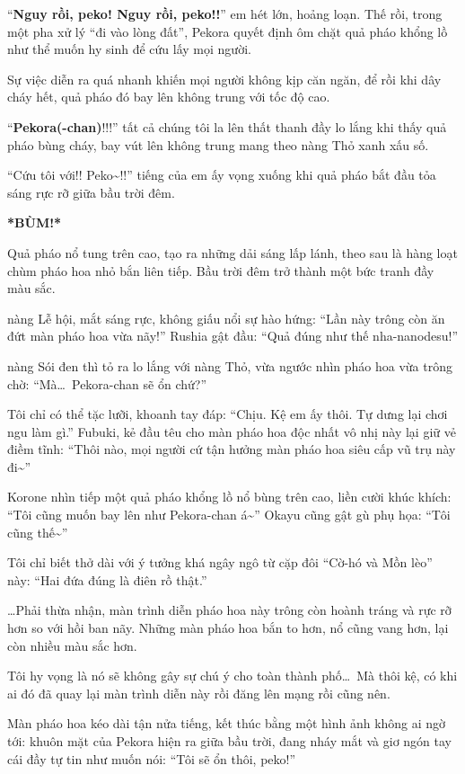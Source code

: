 \documentclass[../main.tex]{subfiles}
\begin{document}
``\textbf{Nguy rồi, peko! Nguy rồi, peko!!}'' em hét lớn, hoảng loạn. Thế rồi, trong một pha xử lý ``đi vào lòng đất'', Pekora quyết định ôm chặt quả pháo khổng lồ như thể muốn hy sinh để cứu lấy mọi người.

Sự việc diễn ra quá nhanh khiến mọi người không kịp căn ngăn, để rồi khi dây cháy hết, quả pháo đó bay lên không trung với tốc độ cao.

``\textbf{Pekora(-chan)}!!!'' tất cả chúng tôi la lên thất thanh đầy lo lắng khi thấy quả pháo bùng cháy, bay vút lên không trung mang theo nàng Thỏ xanh xấu số.

``Cứu tôi với!! Peko\~{}!!'' tiếng của em ấy vọng xuống khi quả pháo bắt đầu tỏa sáng rực rỡ giữa bầu trời đêm.

\textbf{*BÙM!*}

Quả pháo nổ tung trên cao, tạo ra những dải sáng lấp lánh, theo sau là hàng loạt chùm pháo hoa nhỏ bắn liên tiếp. Bầu trời đêm trở thành một bức tranh đầy màu sắc.

nàng Lễ hội, mắt sáng rực, không giấu nổi sự hào hứng: ``Lần này trông còn ăn đứt màn pháo hoa vừa nãy!'' Rushia gật đầu: ``Quả đúng như thế nha-nanodesu!''

nàng Sói đen thì tỏ ra lo lắng với nàng Thỏ, vừa ngước nhìn pháo hoa vừa trông chờ: ``Mà\dots\ Pekora-chan sẽ ổn chứ?''

Tôi chỉ có thể tặc lưỡi, khoanh tay đáp: ``Chịu. Kệ em ấy thôi. Tự dưng lại chơi ngu làm gì.'' Fubuki, kẻ đầu têu cho màn pháo hoa độc nhất vô nhị này lại giữ vẻ điềm tĩnh: ``Thôi nào, mọi người cứ tận hưởng màn pháo hoa siêu cấp vũ trụ này đi\~{}''

Korone nhìn tiếp một quả pháo khổng lồ nổ bùng trên cao, liền cười khúc khích: ``Tôi cũng muốn bay lên như Pekora-chan á\~{}'' Okayu cũng gật gù phụ họa: ``Tôi cũng thế\~{}''

Tôi chỉ biết thở dài với ý tưởng khá ngây ngô từ cặp đôi ``Cờ-hó và Mồn lèo'' này: ``Hai đứa đúng là điên rồ thật.''

\dots Phải thừa nhận, màn trình diễn pháo hoa này trông còn hoành tráng và rực rỡ hơn so với hồi ban nãy. Những màn pháo hoa bắn to hơn, nổ cũng vang hơn, lại còn nhiều màu sắc hơn.

Tôi hy vọng là nó sẽ không gây sự chú ý cho toàn thành phố\dots\ Mà thôi kệ, có khi ai đó đã quay lại màn trình diễn này rồi đăng lên mạng rồi cũng nên.

\ct

Màn pháo hoa kéo dài tận nửa tiếng, kết thúc bằng một hình ảnh không ai ngờ tới: khuôn mặt của Pekora hiện ra giữa bầu trời, đang nháy mắt và giơ ngón tay cái đầy tự tin như muốn nói: ``Tôi sẽ ổn thôi, peko!''
\end{document}
